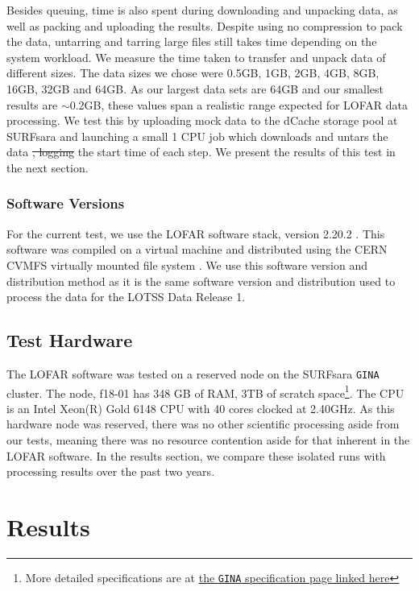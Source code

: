 \documentclass[preprint,5p]{elsarticle}
\providecommand{\DIFadd}[1]{{\protect\color{blue}\uwave{#1}}} %
\providecommand{\DIFdel}[1]{{\protect\color{red}\sout{#1}}}                      %
\providecommand{\DIFaddbegin}{} %
\providecommand{\DIFaddend}{} %
\providecommand{\DIFdelbegin}{} %
\providecommand{\DIFdelend}{} %
\newcommand{\DIFscaledelfig}{0.5}
\newlength{\DIFdelgraphicswidth} %
\newlength{\DIFdelgraphicsheight} %
\newcommand{\DIFaddincludegraphics}[2][]{{\color{blue}\fbox{\DIFOincludegraphics[#1]{#2}}}} %
\newcommand{\DIFdelincludegraphics}[2][]{%
\sbox{\DIFdelgraphicsbox}{\DIFOincludegraphics[#1]{#2}}%
\settoboxwidth{\DIFdelgraphicswidth}{\DIFdelgraphicsbox} %
\settoboxtotalheight{\DIFdelgraphicsheight}{\DIFdelgraphicsbox} %
\scalebox{\DIFscaledelfig}{%
\parbox[b]{\DIFdelgraphicswidth}{\usebox{\DIFdelgraphicsbox}\\[-\baselineskip] \rule{\DIFdelgraphicswidth}{0em}}\llap{\resizebox{\DIFdelgraphicswidth}{\DIFdelgraphicsheight}{%
\setlength{\unitlength}{\DIFdelgraphicswidth}%
\begin{picture}(1,1)%
\thicklines\linethickness{2pt} %
{\color[rgb]{1,0,0}\put(0,0){\framebox(1,1){}}}%
{\color[rgb]{1,0,0}\put(0,0){\line( 1,1){1}}}%
{\color[rgb]{1,0,0}\put(0,1){\line(1,-1){1}}}%
\end{picture}%
}\hspace*{3pt}}} %
} %
\DeclareRobustCommand{\DIFaddbegin}{\DIFOaddbegin \let\includegraphics\DIFaddincludegraphics} %
\DeclareRobustCommand{\DIFaddend}{\DIFOaddend \let\includegraphics\DIFOincludegraphics} %
\DeclareRobustCommand{\DIFdelbegin}{\DIFOdelbegin \let\includegraphics\DIFdelincludegraphics} %
\DeclareRobustCommand{\DIFdelend}{\DIFOaddend \let\includegraphics\DIFOincludegraphics} %
\begin{document}
Besides queuing, time is also spent during downloading and unpacking data, as well as packing and uploading the results. Despite using no compression to pack the data, untarring and tarring large files still takes time depending on the system workload. We measure the time taken to transfer and unpack data of different sizes. The data sizes we chose were 0.5GB, 1GB, 2GB, 4GB, 8GB, 16GB, 32GB and 64GB. As our largest data sets are 64GB and our smallest results are $\sim$0.2GB, these values span a realistic range expected for LOFAR data processing. We test this by uploading mock data to the dCache storage pool at SURFsara and launching a small 1 CPU job \DIFaddbegin \DIFadd{on the cluster, }\DIFaddend which downloads and untars the data \DIFdelbegin \DIFdel{, logging }\DIFdelend \DIFaddbegin \DIFadd{and logs }\DIFaddend the start time of each step. We present the results of this test in the next section. 


\subsubsection{Software Versions}\label{sec:software_versions}
For the current test, we use the LOFAR software stack, version 2.20.2 \citep{cookbook}. This software was compiled on a virtual machine and distributed using the CERN CVMFS virtually mounted file system \citep{cvmfs2008}. We use this software version and distribution method as it is the same software version and distribution used to process the data for the LOTSS Data Release 1. 

\subsection{Test Hardware}\label{sec:hardware}

The LOFAR software was tested on a reserved node on the SURFsara \texttt{GINA} cluster. The node, f18-01 has 348 GB of RAM, 3TB of scratch space\footnote{More detailed specifications are at \href{http://docs.surfsaralabs.nl/projects/grid/en/latest/Pages/Service/system_specifications/gina_specs.html}{the \texttt{GINA} specification page linked here}}. The CPU is an Intel Xeon(R) Gold 6148 CPU with 40 cores clocked at 2.40GHz.  As this hardware node was reserved, there was no other scientific processing aside from our tests, meaning there was no resource contention aside for that inherent in the LOFAR software. In the results section, we compare these isolated runs with processing results over the past two years.  
\section{Results}\label{sec:results}
\end{document}
